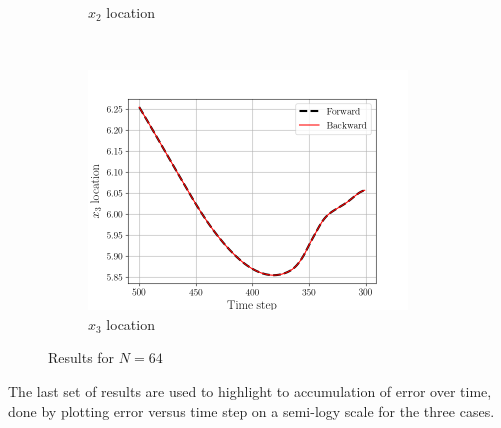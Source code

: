 \begin{figure}[H]
\begin{subfigure}[H]{0.45\textwidth}
        \caption{$x_{2}$ location}
    \end{subfigure}
    ~
    \begin{subfigure}[H]{0.45\textwidth}
        \includegraphics[height=2.5in]{media/rk4/run-128/x3-128-tracking-2.png}
        \caption{$x_{3}$ location}
    \end{subfigure}
    \caption{Results for $N=64$}
    \label{fig:back-tracking-128-2}
\end{figure}
\newpage
The last set of results are used to highlight to accumulation of error over
time, done by plotting error versus time step on a semi-logy scale for the
three cases.
